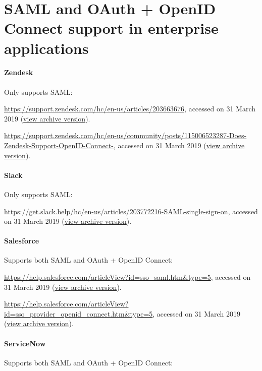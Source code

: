 \section{SAML and OAuth + OpenID Connect support in enterprise applications} \label{sec:appendix-links}

\paragraph{Zendesk} Only supports SAML:

\url{https://support.zendesk.com/hc/en-us/articles/203663676}, accessed on 31 March 2019 (\href{https://web.archive.org/web/20190331182733/https://support.zendesk.com/hc/en-us/articles/203663676}{view archive version}).

\url{https://support.zendesk.com/hc/en-us/community/posts/115006523287-Does-Zendesk-Support-OpenID-Connect-}, accessed on 31 March 2019 (\href{https://web.archive.org/web/20190331182849/https://support.zendesk.com/hc/en-us/community/posts/115006523287-Does-Zendesk-Support-OpenID-Connect-}{view archive version}).

\paragraph{Slack} Only supports SAML:

\url{https://get.slack.help/hc/en-us/articles/203772216-SAML-single-sign-on}, accessed on 31 March 2019 (\href{https://web.archive.org/web/20190331183030/https://get.slack.help/hc/en-us/articles/203772216-SAML-single-sign-on}{view archive version}).

\paragraph{Salesforce} Supports both SAML and OAuth + OpenID Connect:

\url{https://help.salesforce.com/articleView?id=sso_saml.htm&type=5}, accessed on 31 March 2019 (\href{https://web.archive.org/web/20190331183852/https://help.salesforce.com/articleView?id=sso_saml.htm&type=5}{view archive version}).

\url{https://help.salesforce.com/articleView?id=sso_provider_openid_connect.htm&type=5}, accessed on 31 March 2019 (\href{https://web.archive.org/web/20190331184051/https://help.salesforce.com/articleView?id=sso_provider_openid_connect.htm&type=5}{view archive version}).

\paragraph{ServiceNow} Supports both SAML and OAuth + OpenID Connect:

